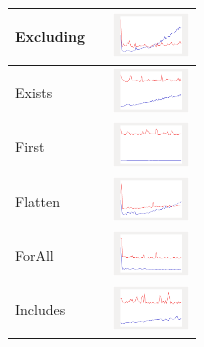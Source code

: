 \begin{longtable}{ m{2.5cm} m{8cm} m{2cm} }
Excluding &

&
\includegraphics[width=2cm]{../graphs/orderedset/small/Excluding}
\\\hline

Exists &

&
\includegraphics[width=2cm]{../graphs/orderedset/small/Exists}
\\\hline

First &

&
\includegraphics[width=2cm]{../graphs/orderedset/small/First}
\\\hline

Flatten &

&
\includegraphics[width=2cm]{../graphs/orderedset/small/Flatten}
\\\hline

ForAll &

&
\includegraphics[width=2cm]{../graphs/orderedset/small/forALL}
\\\hline

Includes &

&
\includegraphics[width=2cm]{../graphs/orderedset/small/Includes}
\\\hline


\end{longtable}
